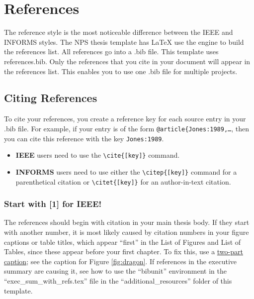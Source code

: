 \section{References}
The reference style is the most noticeable difference between the IEEE and INFORMS styles.
The NPS thesis template has \LaTeX{} use the \BibTeX{} engine to build the references list.
All references go into a .bib file.  This template uses references.bib.  Only the references that you cite in your document will appear in the references list.  This enables you to use one .bib file for multiple projects.

\subsection{Citing References}
To cite your references, you create a reference key for each source entry in your .bib file.  For example, if your \BibTeX{} entry is of the form {\tt @article\{Jones:1989,\dots}, then you can cite this reference with the key {\tt Jones:1989}.
\begin{itemize}
    \item \textbf{IEEE} users need to use the \verb|\cite{[key]}| command.
    \item \textbf{INFORMS} users need to use either the \verb|\citep{[key]}| command for a parenthetical citation or \verb|\citet{[key]}| for an author-in-text citation.
\end{itemize}

\ifinforms
\else
\let\citep\cite
\let\citet\cite
\fi

\subsubsection{Start with [1] for IEEE!}\label{sec:firstone}
The references should begin with citation \citep{pollan_2006} in your main thesis body. If they start with another number, it is most likely caused by citation numbers in your figure captions or table titles, which appear ``first'' in the List of Figures and List of Tables, since these appear before your first chapter. To fix this, use a \underline{two-part caption}; see the caption for Figure \ref{fig:dragon}. If references in the executive summary are causing it, see how to use the ``bibunit'' environment in the ``exec\_sum\_with\_refs.tex'' file in the ``additional\_resources'' folder of this template.

